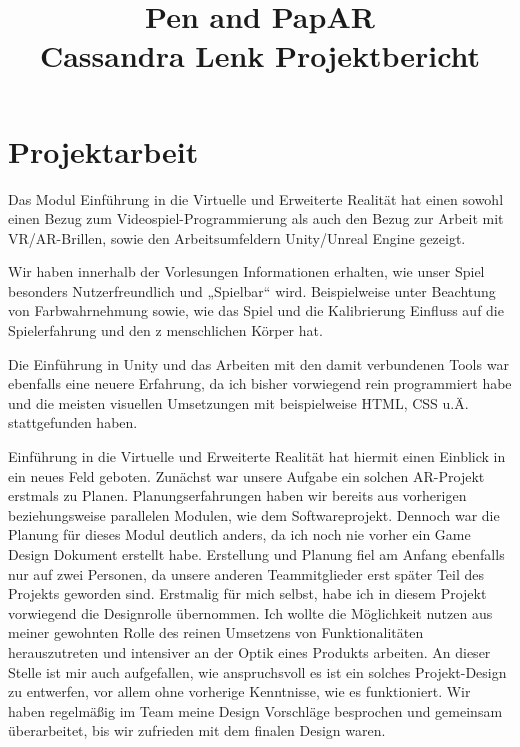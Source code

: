 \documentclass[11pt]{article}
\begin{document}
    \title{Pen and PapAR \\ \large \textminus Cassandra Lenk Projektbericht \textminus}

    \maketitle

    \section{Projektarbeit}\label{sec:chapter_projectwork_clenk}

    Das Modul Einführung in die Virtuelle und Erweiterte Realität hat einen sowohl einen Bezug
    zum Videospiel-Programmierung als auch den Bezug zur Arbeit mit VR/AR-Brillen,
    sowie den Arbeitsumfeldern Unity/Unreal Engine gezeigt.

    Wir haben innerhalb der Vorlesungen Informationen erhalten, wie unser Spiel besonders
    Nutzerfreundlich und „Spielbar“ wird. Beispielweise unter Beachtung von Farbwahrnehmung
    sowie, wie das Spiel und die Kalibrierung Einfluss auf die Spielerfahrung und den z
    menschlichen Körper hat.

    Die Einführung in Unity und das Arbeiten mit den damit verbundenen Tools war ebenfalls eine
    neuere Erfahrung, da ich bisher vorwiegend rein programmiert habe und die meisten visuellen
    Umsetzungen mit beispielweise HTML, CSS u.Ä. stattgefunden haben.

    Einführung in die Virtuelle und Erweiterte Realität hat hiermit einen Einblick in ein neues Feld geboten.
    Zunächst war unsere Aufgabe ein solchen AR-Projekt erstmals zu Planen. Planungserfahrungen
    haben wir bereits aus vorherigen beziehungsweise parallelen Modulen,
    wie dem Softwareprojekt. Dennoch war die Planung für dieses Modul deutlich anders,
    da ich noch nie vorher ein Game Design Dokument erstellt habe.
    Erstellung und Planung fiel am Anfang ebenfalls nur auf zwei Personen, da unsere anderen
    Teammitglieder erst später Teil des Projekts geworden sind.
    Erstmalig für mich selbst, habe ich in diesem Projekt vorwiegend die Designrolle übernommen.
    Ich wollte die Möglichkeit nutzen aus meiner gewohnten Rolle des reinen Umsetzens von Funktionalitäten
    herauszutreten und intensiver an der Optik eines Produkts arbeiten.
    An dieser Stelle ist mir auch aufgefallen, wie anspruchsvoll es ist ein solches Projekt-Design
    zu entwerfen, vor allem ohne vorherige Kenntnisse, wie es funktioniert.
    Wir haben regelmäßig im Team meine Design Vorschläge besprochen und gemeinsam überarbeitet, bis wir
    zufrieden mit dem finalen Design waren.
\end{document}
